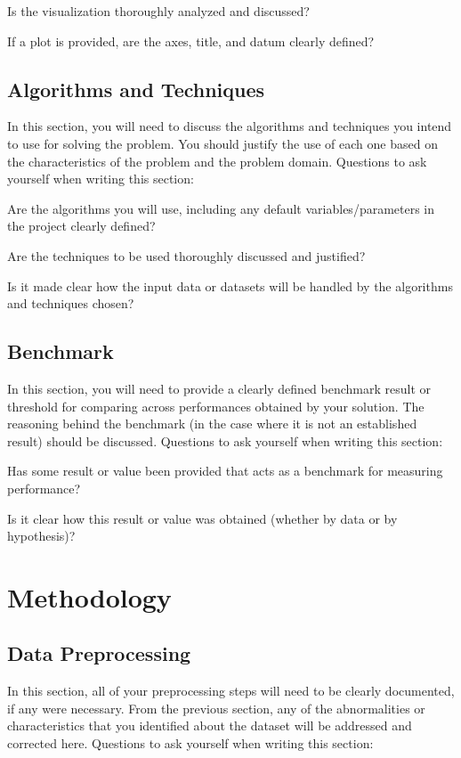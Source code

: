 \documentclass[12pt,journal,compsoc]{IEEEtran}
\begin{document}
Is the visualization thoroughly analyzed and discussed?

If a plot is provided, are the axes, title, and datum clearly defined?


\subsection{Algorithms and Techniques}
In this section, you will need to discuss the algorithms and techniques you intend to use for solving the problem. You should justify the use of each one based on the characteristics of the problem and the problem domain. Questions to ask yourself when writing this section:

Are the algorithms you will use, including any default variables/parameters in the project clearly defined?

Are the techniques to be used thoroughly discussed and justified?

Is it made clear how the input data or datasets will be handled by the algorithms and techniques chosen?


\subsection{Benchmark}
In this section, you will need to provide a clearly defined benchmark result or threshold for comparing across performances obtained by your solution. The reasoning behind the benchmark (in the case where it is not an established result) should be discussed. Questions to ask yourself when writing this section:

Has some result or value been provided that acts as a benchmark for measuring performance?

Is it clear how this result or value was obtained (whether by data or by hypothesis)?


\section{Methodology} %
\subsection{Data Preprocessing}
In this section, all of your preprocessing steps will need to be clearly documented, if any were necessary. From the previous section, any of the abnormalities or characteristics that you identified about the dataset will be addressed and corrected here. Questions to ask yourself when writing this section:
\end{document}
